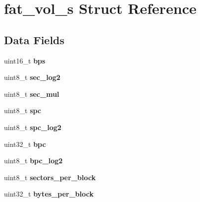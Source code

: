 \hypertarget{structfat__vol__s}{}\section{fat\+\_\+vol\+\_\+s Struct Reference}
\label{structfat__vol__s}
\subsection*{Data Fields}
\begin{DoxyCompactItemize}
\item 
\mbox{\label{structfat__vol__s_af919636dbd20bb46eca42a623c2170e5}} 
uint16\+\_\+t {\bfseries bps}
\item 
\mbox{\label{structfat__vol__s_a4f680be8e243754c340f460c9961635b}} 
uint8\+\_\+t {\bfseries sec\+\_\+log2}
\item 
\mbox{\label{structfat__vol__s_a4983d635e0395bf8f7253587933134ba}} 
uint8\+\_\+t {\bfseries sec\+\_\+mul}
\item 
\mbox{\label{structfat__vol__s_a028d20fd804981e05784858b08514aad}} 
uint8\+\_\+t {\bfseries spc}
\item 
\mbox{\label{structfat__vol__s_a0a2b9479b9503d163e4e1f269fabaab7}} 
uint8\+\_\+t {\bfseries spc\+\_\+log2}
\item 
\mbox{\label{structfat__vol__s_aa5a56bc66b24e505510af81b69406844}} 
uint32\+\_\+t {\bfseries bpc}
\item 
\mbox{\label{structfat__vol__s_ab09320576cbc207dd76e80e702e49af4}} 
uint8\+\_\+t {\bfseries bpc\+\_\+log2}
\item 
\mbox{\label{structfat__vol__s_a8e36ad539fa4e32aac3f525748909dc4}} 
uint8\+\_\+t {\bfseries sectors\+\_\+per\+\_\+block}
\item 
\mbox{\label{structfat__vol__s_a92d2f7a02ca94210b42b48278b8813cf}} 
uint32\+\_\+t {\bfseries bytes\+\_\+per\+\_\+block}
\item 
\mbox{\label{structfat__vol__s_ae51daf79c6defbbd53e8dad7b5d86859}} 

\end{DoxyCompactItemize}
